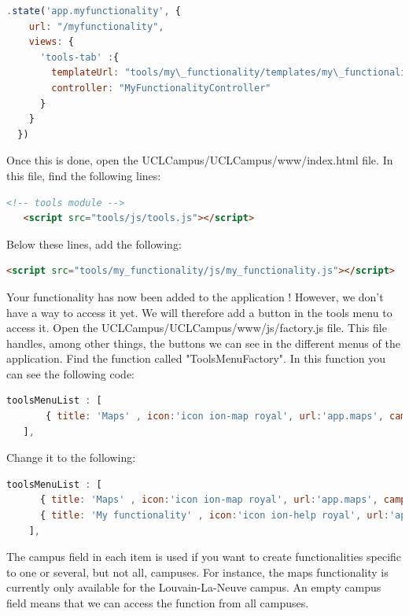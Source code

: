 \documentclass[11pt, a4paper]{report}
\begin{document}
\begin{lstlisting}[language=JavaScript]
.state('app.myfunctionality', {
    url: "/myfunctionality",
    views: {
      'tools-tab' :{
        templateUrl: "tools/my\_functionality/templates/my\_functionality.html",
        controller: "MyFunctionalityController"
      }
    }
  })
\end{lstlisting} 

Once this is done, open the UCLCampus/UCLCampus/www/index.html file. In this file, find the following lines:

\begin{lstlisting}[language=HTML]
   <!-- tools module -->
   <script src="tools/js/tools.js"></script>
\end{lstlisting}

Below these lines, add the following:

\begin{lstlisting}[language=HTML]
   <script src="tools/my_functionality/js/my_functionality.js"></script>
\end{lstlisting}

Your functionality has now been added to the application ! However, we don't have a way to access it yet. We will therefore add a button in the tools menu to access it. Open the UCLCampus/UCLCampus/www/js/factory.js file. This file handles, among other things, the buttons we can see in the different menus of the application. Find the function called "ToolsMenuFactory".  In this function you can see the following code:

\begin{lstlisting}[language=JavaScript]
   toolsMenuList : [
       { title: 'Maps' , icon:'icon ion-map royal', url:'app.maps', campus:['Louvain-la-Neuve']}
   ], 
\end{lstlisting}

Change it to the following:

\begin{lstlisting}[language=JavaScript]
   toolsMenuList : [
      { title: 'Maps' , icon:'icon ion-map royal', url:'app.maps', campus:['Louvain-la-Neuve']},
      { title: 'My functionality' , icon:'icon ion-help royal', url:'app.myfunctionality', campus:[]}
    ],
\end{lstlisting}

The campus field in each item is used if you want to create functionalities specific to one or several, but not all, campuses. For instance, the maps functionality is currently only available for the Louvain-La-Neuve campus. An empty campus field means that we can access the function from all campuses.
\end{document}
